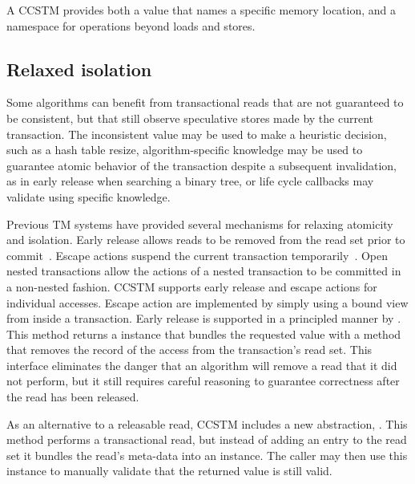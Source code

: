 
A CCSTM  provides both a value that names a specific memory
location, and a namespace for operations beyond loads and stores.

\subsection{Relaxed isolation}
\label{sec:unrecordedread}

Some algorithms can benefit from transactional reads that are not guaranteed to
be consistent, but
that still observe speculative stores made by the current transaction.
The inconsistent value may be used to make a heuristic decision, such as a
hash table resize, algorithm-specific knowledge may be used to guarantee
atomic behavior of the transaction despite a subsequent invalidation,
as in early release when searching a binary tree, or life cycle callbacks
may validate using specific knowledge.

Previous TM systems have provided several mechanisms for relaxing
atomicity and isolation.  Early release allows reads to be removed
from the read set prior to commit~\cite{HerlihyLMS03}.  Escape actions
suspend the current transaction temporarily~\cite{harris04exceptions}.
Open nested transactions allow the actions of a nested transaction to
be committed in a non-nested fashion.  CCSTM supports early release
and escape actions for individual accesses.  Escape action are
implemented by simply using a  bound view from inside
a transaction.  Early release is supported in a principled manner
by .  This method returns a
 instance that bundles the requested value with
a method that removes the record of the access from the transaction's
read set.  This interface eliminates the danger that an algorithm will
remove a read that it did not perform, but it still requires careful
reasoning to guarantee correctness after the read has been released.

As an alternative to a releasable read, CCSTM includes a new
abstraction, .  This method performs a
transactional read, but instead of adding an entry to the read set it
bundles the read's meta-data into an  instance.
The caller may then use this instance to manually validate that the
returned value is still valid.

